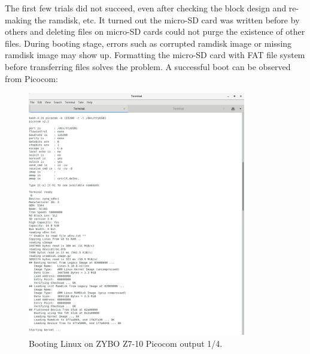 \documentclass[11pt,letterpaper,titlepage]{article}
\begin{document}
The first few trials did not succeed, even after checking the block design and re-making the ramdisk, etc. It turned out the micro-SD card was written before by others and deleting files on micro-SD cards could not purge the existence of other files. During booting stage, errors such as corrupted ramdisk image or missing ramdisk image may show up. Formatting the micro-SD card with FAT file system before transferring files solves the problem. A successful boot can be observed from Picocom:

\begin{figure}[ht]
    \centering
    \includegraphics[width=0.85\textwidth]{boot_1.png}
    \caption{Booting Linux on ZYBO Z7-10 Picocom output 1/4.}
\end{figure}

\newpage
\end{document}
